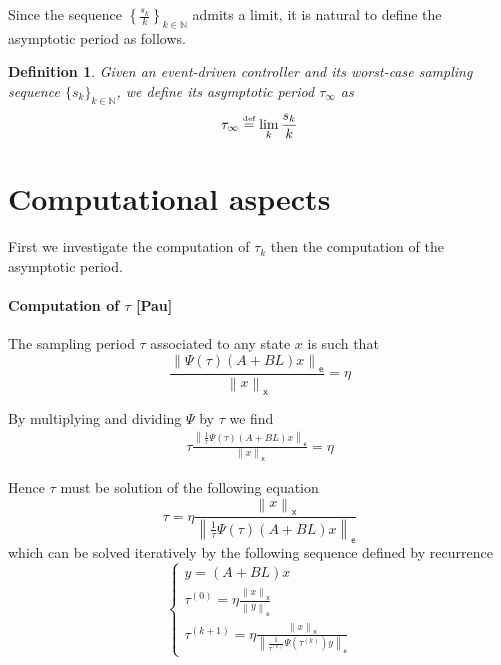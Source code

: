 \documentclass[12pt,draftcls,onecolumn]{IEEEtran} %
\newtheorem{definition}[theorem]{Definition}
\newcommand{\nE}[1]{\left\|#1\right\|_{\mathsf e}}
\newcommand{\nX}[1]{\left\|#1\right\|_{\mathsf x}}
\newcommand{\equals}{\stackrel{\mbox{\tiny{\rm def}}}{=}}
\newcommand{\NN}{\mathbb{N}}
\begin{document}
Since the sequence $\left\{\frac{s_k}k\right\}_{k\in\NN}$ admits a
limit, it is natural to define the asymptotic period as follows.
\begin{definition}
  Given an event-driven controller and its worst-case sampling
  sequence $\{s_k\}_{k\in\NN}$, we define its \emph{asymptotic period}
  $\tau_\infty$ as
  \begin{equation}
    \label{eq:I:defAsymPeriod}
    \tau_\infty \equals \lim_k\frac{s_k}k
  \end{equation}
\end{definition}


\section{Computational aspects}
\label{sec:comupteAsym}

First we investigate the computation of $\tau_k$ then the computation
of the asymptotic period.

\paragraph{Computation of $\tau$ [Pau]}

The sampling period $\tau$ associated to any state $x$ is such that
\begin{equation}
  \frac{\nE{\Psi(\tau)(A+BL)x}}{\nX{x}} =\eta
  \label{eq:samPeriod}
\end{equation}

By multiplying and dividing $\Psi$ by $\tau$ we find
\begin{gather*}
  \tau\frac{\nE{\frac 1{\tau}\Psi(\tau)(A+BL)x}}{\nX{x}} =\eta
\end{gather*}

Hence $\tau$ must be solution of the following equation
\begin{equation}
  \tau =\eta\frac{\nX{x}}{\nE{\frac 1{\tau}\Psi(\tau)(A+BL)x}}
  \label{eq:eqTau}
\end{equation}
which can be solved iteratively by the following sequence defined by
recurrence
\begin{equation}
  \label{eq:recSequence}
  \begin{cases}
    y = (A+BL)x \\
    \tau^{(0)} = \eta\frac{\nX{x}}{\nE{y}}\\
    \tau^{(k+1)} =
    \eta\frac{\nX{x}}{\nE{\frac 1{\tau^{(k)}}\Psi(\tau^{(k)})y}}
  \end{cases}
\end{equation}
\end{document}
